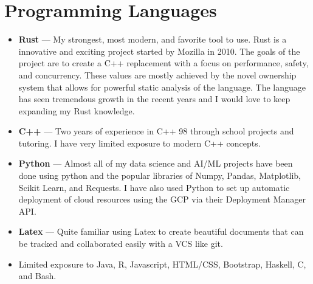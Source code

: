 \documentclass{article}
\begin{document}
\section{Programming Languages}
\begin{itemize}
   \item \textbf{Rust} --- My strongest, most modern, and favorite tool to use. Rust is a innovative and exciting
         project started by Mozilla in 2010. The goals of the project are to create a C++ replacement with a
         focus on performance, safety, and concurrency. These values are mostly achieved by the novel ownership
         system that allows for powerful static analysis of the language. The language has seen tremendous growth
         in the recent years and I would love to keep expanding my Rust knowledge.
      \item \textbf{C++} --- Two years of experience in C++ 98 through school projects and tutoring. I have very limited
         exposure to modern C++ concepts.
      \item \textbf{Python} --- Almost all of my data science and AI/ML projects have been done using python and the popular
         libraries of Numpy, Pandas, Matplotlib, Scikit Learn, and Requests. I have also used Python to set up automatic
         deployment of cloud resources using the GCP via their Deployment Manager API.
      \item \textbf{Latex} --- Quite familiar using Latex to create beautiful documents that can be tracked and collaborated easily
         with a VCS like git.
      \item Limited exposure to Java, R, Javascript, HTML/CSS, Bootstrap, Haskell, C, and Bash.
\end{itemize}
\end{document}
